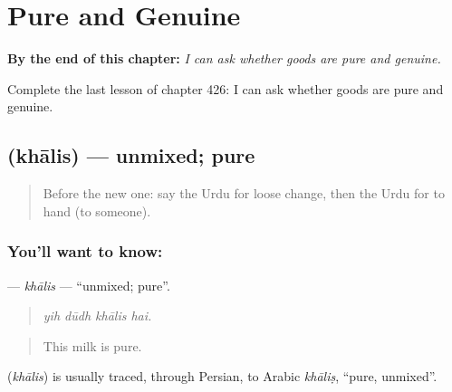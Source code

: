 
\chapter{Pure and Genuine}
\label{ch:ur-pure-and-genuine}

\begin{chapteropening}
\textbf{By the end of this chapter:} \emph{I can ask whether goods are pure and genuine.}

Complete the last lesson of chapter 426: I can ask whether goods are pure and genuine.
\end{chapteropening}

\section[\texorpdfstring{\ur{خالص} (khālis)}{خالص (khālis)}]{ (khālis) — unmixed; pure}

\label{lesson:UR-C426-khalis}



\begin{quote}
Before the new one: say the Urdu for loose change, then the Urdu for to hand (to someone).
\end{quote}

\subsection*{You'll want to know: }
\textbf{} — \emph{khālis} — \textquotedblleft{}unmixed; pure\textquotedblright{}.

\begin{quote}
   
\end{quote}

\begin{quote}
\emph{yih dūdh khālis hai.}
\end{quote}

\begin{quote}
This milk is pure.
\end{quote}

\begin{cousinweb}
\textbf{} (\emph{khālis}) is usually traced, through Persian, to Arabic \emph{khāliṣ}, \textquotedblleft{}pure, unmixed\textquotedblright{}.
\end{cousinweb}

